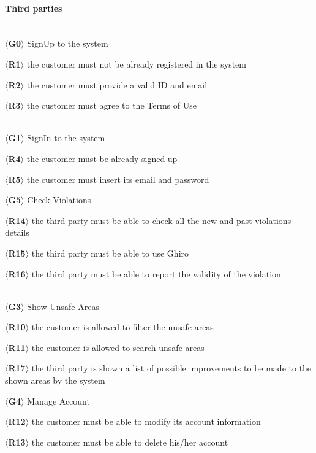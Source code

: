 \documentclass{article}
\begin{document}
\paragraph{Third parties}\mbox{}\\
$\langle$\textbf{G0}$\rangle$ SignUp to the system
\begin{description}
    \item $\langle$\textbf{R1}$\rangle$ the customer must not be already
    registered  in the system
    \item $\langle$\textbf{R2}$\rangle$ the customer must provide a valid ID and
    email
    \item $\langle$\textbf{R3}$\rangle$ the customer must agree to the Terms of Use
\end{description}\mbox{}\\
$\langle$\textbf{G1}$\rangle$ SignIn to the system
\begin{description}
    \item $\langle$\textbf{R4}$\rangle$ the customer must be already signed up
    \item $\langle$\textbf{R5}$\rangle$ the customer must insert its email and
    password\\
\end{description}
$\langle$\textbf{G5}$\rangle$ Check Violations
\begin{description}
    \item $\langle$\textbf{R14}$\rangle$ the third party must be able to check all
    the new and past violations details
    \item $\langle$\textbf{R15}$\rangle$ the third party must be able to use Ghiro
    \item $\langle$\textbf{R16}$\rangle$ the third party must be able to report
    the validity of the violation \end{description}\mbox{}\\
$\langle$\textbf{G3}$\rangle$ Show Unsafe Areas
\begin{description}
    \item $\langle$\textbf{R10}$\rangle$ the customer is allowed to filter the unsafe
    areas
    \item $\langle$\textbf{R11}$\rangle$ the customer is allowed to search unsafe
    areas 
    \item $\langle$\textbf{R17}$\rangle$ the third party is shown a list of
    possible improvements to be made to the shown areas by the system
\end{description}
$\langle$\textbf{G4}$\rangle$ Manage Account
\begin{description}
    \item $\langle$\textbf{R12}$\rangle$ the customer must be able to modify its
    account information
    \item $\langle$\textbf{R13}$\rangle$ the customer must be able to delete his/her
    account
\end{description}    
\end{document}
